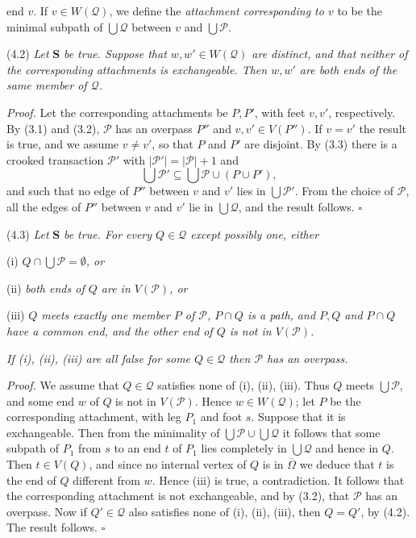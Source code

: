 \noindent end $v$. If $v \in W(\mathscr{Q})$, we define the \textit{attachment corresponding to $v$} to be the minimal subpath of $\bigcup \mathscr{Q}$ between $v$ and $\bigcup \mathscr{P}$.

\stmt
(4.2) \textit{Let} \textbf{S} \textit{be true. Suppose that $w, w' \in W(\mathscr{Q})$ are distinct, and that neither of the corresponding attachments is exchangeable. Then $w, w'$ are both ends of the same member of $\mathscr{Q}$.}

\textit{Proof.} Let the corresponding attachments be $P, P'$, with feet $v, v'$, respectively. By (3.1) and (3.2), $\mathscr{P}$ has an overpass $P''$ and $v, v' \in V(P'')$. If $v = v'$ the result is true, and we assume $v \ne v'$, so that $P$ and $P'$ are disjoint. By (3.3) there is a crooked transaction $\mathscr{P}'$ with $|\mathscr{P}'| = |\mathscr{P}| + 1$ and
\begin{equation*}
\bigcup \mathscr{P}' \subseteq \bigcup \mathscr{P} \cup (P \cup P'),
\end{equation*}
and such that no edge of $P''$ between $v$ and $v'$ lies in $\bigcup \mathscr{P}'$. From the choice of $\mathscr{P}$, all the edges of $P''$ between $v$ and $v'$ lie in $\bigcup \mathscr{Q}$, and the result follows. $\square$

\stmt
(4.3) \textit{Let} \textbf{S} \textit{be true. For every $Q \in \mathscr{Q}$ except possibly one, either}

\hspace*{12pt}(i) \textit{$Q \cap \bigcup \mathscr{P} = \emptyset$, or}

\hspace*{12pt}(ii) \textit{both ends of $Q$ are in $V(\mathscr{P})$, or}

\hspace*{12pt}(iii) \textit{$Q$ meets exactly one member $P$ of $\mathscr{P}$, $P \cap Q$ is a path, and $P, Q$ and $P \cap Q$ have a common end, and the other end of $Q$ is not in $V(\mathscr{P})$.}

\textit{If (i), (ii), (iii) are all false for some $Q \in \mathscr{Q}$ then $\mathscr{P}$ has an overpass.}

\textit{Proof.} We assume that $Q \in \mathscr{Q}$ satisfies none of (i), (ii), (iii). Thus $Q$ meets $\bigcup \mathscr{P}$, and some end $w$ of $Q$ is not in $V(\mathscr{P})$. Hence $w \in W(\mathscr{Q})$; let $P$ be the corresponding attachment, with leg $P_1$ and foot $s$. Suppose that it is exchangeable. Then from the minimality of $\bigcup \mathscr{P} \cup \bigcup \mathscr{Q}$ it follows that some subpath of $P_1$ from $s$ to an end $t$ of $P_1$ lies completely in $\bigcup \mathscr{Q}$ and hence in $Q$. Then $t \in V(Q)$, and since no internal vertex of $Q$ is in $\bar{\Omega}$ we deduce that $t$ is the end of $Q$ different from $w$. Hence (iii) is true, a contradiction. It follows that the corresponding attachment is not exchangeable, and by (3.2), that $\mathscr{P}$ has an overpass. Now if $Q' \in \mathscr{Q}$ also satisfies none of (i), (ii), (iii), then $Q = Q'$, by (4.2). The result follows. $\square$

